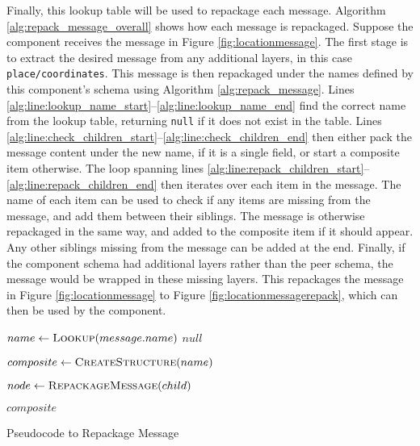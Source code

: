 \documentclass[12pt,twoside,notitlepage]{report}
\begin{document}
Finally, this lookup table will be used to repackage each message. 
Algorithm \ref{alg:repack_message_overall} shows how each message is repackaged. 
Suppose the component receives the message in Figure \ref{fig:locationmessage}. 
The first stage is to extract the desired message from any additional layers, in this case {\tt place/coordinates}. 
This message is then repackaged under the names defined by this component's schema using Algorithm \ref{alg:repack_message}. 
Lines \ref{alg:line:lookup_name_start}--\ref{alg:line:lookup_name_end} find the correct name from the lookup table, returning {\tt null} if it does not exist in the table. 
Lines \ref{alg:line:check_children_start}--\ref{alg:line:check_children_end} then either pack the message content under the new name, if it is a single field, or start a composite item otherwise. 
The loop spanning lines \ref{alg:line:repack_children_start}--\ref{alg:line:repack_children_end} then iterates over each item in the message. 
The name of each item can be used to check if any items are missing from the message, and add them between their siblings. 
The message is otherwise repackaged in the same way, and added to the composite item if it should appear. 
Any other siblings missing from the message can be added at the end. 
Finally, if the component schema had additional layers rather than the peer schema, the message would be wrapped in these missing layers. 
This repackages the message in Figure \ref{fig:locationmessage} to Figure \ref{fig:locationmessagerepack}, which can then be used by the component. 

\begin{algorithm}
\begin{algorithmic}[1]
	 \label{alg:line:lookup_name_start}
		\State $name\gets \Call{Lookup}{message.name}$
	\Else
		\State \Return $null$
	\EndIf \label{alg:line:lookup_name_end}
	
	 \label{alg:line:check_children_start}
		\State \Return {}
	\Else
		\State $composite\gets \Call{CreateStructure}{name}$
	\EndIf \label{alg:line:check_children_end}
		
	 \label{alg:line:repack_children_start}
		\State {}
		
		\State $node \gets \Call{RepackageMessage}{child}$
			\State {}
		\EndIf
	\EndFor \label{alg:line:repack_children_end}
	
	\State {}

	\State \Return $composite$
	
\EndFunction
\end{algorithmic}
\caption{Pseudocode to Repackage Message}
\label{alg:repack_message}
\end{algorithm}
\end{document}
